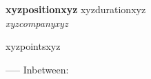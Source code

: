 \noindent\textbf{xyzpositionxyz} \hfill xyzdurationxyz \\[-4pt]
\textit{xyzcompanyxyz}
\vspace{1pt}
\begin{itemize}[leftmargin=1.5em, itemsep=-1pt, topsep=2pt]
xyzpointsxyz
\end{itemize}
-----
Inbetween: \vspace{5pt}
